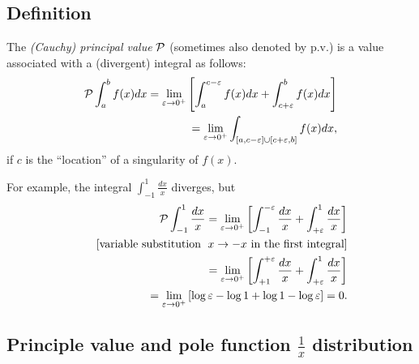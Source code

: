 \subsection{Definition}

The {\em  (Cauchy) principal value} ${\cal P}$ (sometimes also denoted by $\textrm{p.v.}$)
is a value associated with a (divergent) integral as follows:
\begin{equation}
\begin{split}
{\cal P}
\int_{a}^b f(x) dx
= \lim_{\varepsilon \rightarrow 0^+}
\left[
\int_{a}^{c-\varepsilon} f(x) dx
+
\int_{c+\varepsilon}^{b} f(x) dx
\right]
\\
\qquad
=  \lim_{\varepsilon \rightarrow 0^+}
\int_{[a,c-\varepsilon] \cup [c+\varepsilon,b]}   f(x) dx
,
\end{split}
\end{equation}
if $c$ is the ``location'' of a singularity of $f(x)$.


{
\color{blue}
\bexample
For example, the integral
$ \int_{-1}^1 \frac{dx}{x}$ diverges, but
\begin{equation}
\begin{split}
{\cal P}
\int_{-1}^1 \frac{dx}{x}
= \lim_{\varepsilon \rightarrow 0^+}
\left[
\int_{-1}^{ -\varepsilon}\frac{dx}{x}
+
\int_{ +\varepsilon}^{1} \frac{dx}{x}
\right]
\\
\qquad
[\textrm{variable substitution }\; x\rightarrow -x \textrm{ in the first integral}]
\\
\qquad
=
\lim_{\varepsilon \rightarrow 0^+}
\left[
\int_{+1}^{ +\varepsilon}\frac{dx}{x}
+
\int_{ +\varepsilon}^{1} \frac{dx}{x}
\right]
\\
\qquad
=
\lim_{\varepsilon \rightarrow 0^+}
\left[
\log \varepsilon - \log 1  + \log 1  - \log \varepsilon
\right]
=0.
\end{split}
\end{equation}
\eexample
}

\subsection{Principle value and pole function $\frac{1}{x}$ distribution}

